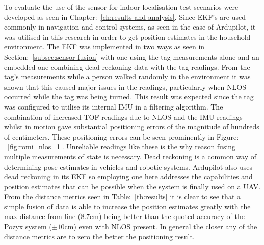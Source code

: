 To evaluate the use of the sensor for indoor localisation test scenarios were developed as seen in Chapter:~\ref{ch:results-and-analysis}.
Since EKF's are used commonly in navigation and control systems, as seen in the case of Ardupilot, it was utilised in this research in order to get position estimates in the household environment.
The EKF was implemented in two ways as seen in Section:~\ref{subsec:sensor-fusion} with one using the tag measurements alone and an embedded one combining dead reckoning data with the tag readings.
From the tag's measurements while a person walked randomly in the environment it was shown that this caused major issues in the readings, particularly when NLOS occurred while the tag was being turned.
This result was expected since the tag was configured to utilise its internal IMU in a filtering algorithm.
The combination of increased TOF readings due to NLOS and the IMU readings whilst in motion gave substantial positioning errors of the magnitude of hundreds of centimeters.
These positioning errors can be seen prominently in Figure: ~\ref{fig:romi_nlos_1}.
Unreliable readings like these is the why reason fusing multiple measurements of state is necessary.
Dead reckoning is a common way of determining pose estimates in vehicles and robotic systems.
Ardupilot also uses dead reckoning in its EKF so employing one here addresses the capabilities and position estimates that can be possible when the system is finally used on a UAV.
From the distance metrics seen in Table:~\ref{tb:results} it is clear to see that a simple fusion of data is able to increase the position estimates greatly with the max distance from line (8.7cm) being better than the quoted accuracy of the Pozyx system ($\pm10$cm) even with NLOS present.
In general the closer any of the distance metrics are to zero the better the positioning result.


